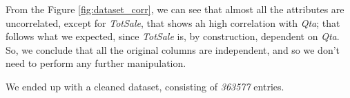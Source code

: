 From the Figure \ref{fig:dataset_corr}, we can see that almost all the attributes are uncorrelated, except for \emph{TotSale}, that shows ah high correlation with \emph{Qta}; that follows what we expected, since \emph{TotSale} is, by construction, dependent on \emph{Qta}. So, we conclude that all the original columns are independent, and so we don't need to perform any further manipulation.

We ended up with a cleaned dataset, consisting of \emph{363577} entries.

